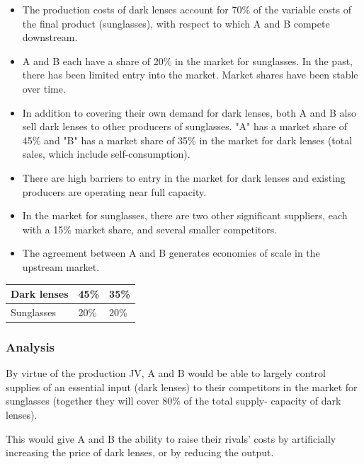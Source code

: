         \begin{itemize}
            \item The production costs of dark lenses account for 70\% of the variable costs of the final product (sunglasses), with respect to which A and B compete downstream.
            \item A and B each have a share of 20\% in the market for sunglasses. In the past, there has been limited entry into the market. Market shares have been stable over time.
            \item In addition to covering their own demand for dark lenses, both A and B also sell dark lenses to other producers of sunglasses. "A" has a market share of 45\% and "B" has a market share of 35\% in the market for dark lenses (total sales, which include self-consumption).
            \item There are high barriers to entry in the market for dark lenses and existing producers are operating near full capacity.
            \item In the market for sunglasses, there are two other significant suppliers, each with a 15\% market share, and several smaller competitors.
            \item The agreement between A and B generates economies of scale in the upstream market.
        \end{itemize}

        \begin{center}
        \begin{tabular}{l|l|l|}
            Dark lenses & 45\% & 35\% \\
            \hline
            Sunglasses & 20\% & 20\% \\
            \hline
        \end{tabular}
        \end{center}

        \subsubsection{Analysis}

            By virtue of the production JV, A and B would be able to largely control supplies of an essential input (dark lenses) to their competitors in the market for sunglasses (together they will cover 80\% of the total supply- capacity of dark lenses). 
            
            This would give A and B the ability to raise their rivals’ costs by artificially increasing the price of dark lenses, or by reducing the output. 
            
